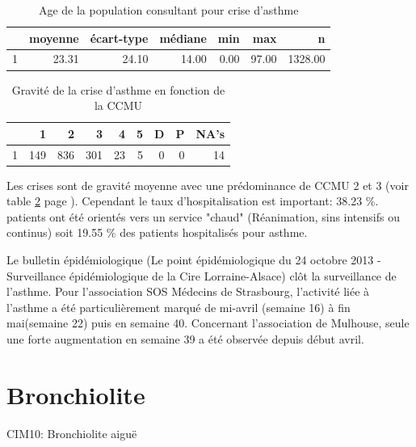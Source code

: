 \documentclass[12pt,english,french,twoside]{report}\usepackage[]{graphicx}\usepackage[]{color}
\begin{document}
\begin{table}[ht]
\centering
\begin{tabular}{rrrrrrr}
  \hline
 & moyenne & écart-type & médiane & min & max & n \\ 
  \hline
1 & 23.31 & 24.10 & 14.00 & 0.00 & 97.00 & 1328.00 \\ 
   \hline
\end{tabular}
\caption[Asthme et age]{Age de la population consultant pour crise d'asthme} 
\label{tab:age_asthme}
\end{table}
\begin{table}[ht]
\centering
\begin{tabular}{rrrrrrrrr}
  \hline
 & 1 & 2 & 3 & 4 & 5 & D & P & NA's \\ 
  \hline
1 & 149 & 836 & 301 &  23 &   5 &   0 &   0 &  14 \\ 
   \hline
\end{tabular}
\caption[Asthme et CCMU]{Gravité de la crise d'asthme en fonction de la CCMU} 
\label{tab:ccmu_asthme}
\end{table}



Les crises sont de gravité moyenne avec une prédominance de CCMU 2 et 3 (voir table \ref{tab:ccmu_asthme} page \pageref{tab:ccmu_asthme}).
Cependant le taux d'hospitalisation est important: 38.23 \%.
 patients ont été orientés vers un service "chaud" (Réanimation, sins intensifs ou continus) soit 19.55 \% des patients hospitalisés pour asthme.

Le bulletin épidémiologique (Le point épidémiologique du 24 octobre 2013 - Surveillance épidémiologique de la Cire Lorraine-Alsace) clôt la surveillance de l’asthme. Pour l’association SOS Médecins de Strasbourg, l’activité liée à l’asthme a été particulièrement marqué de mi-avril (semaine 16) à fin mai(semaine 22) puis en semaine 40. Concernant l’association de Mulhouse, seule une forte augmentation en semaine 39 a été observée depuis début avril.

\section{Bronchiolite}

CIM10: Bronchiolite aiguë
\end{document}
